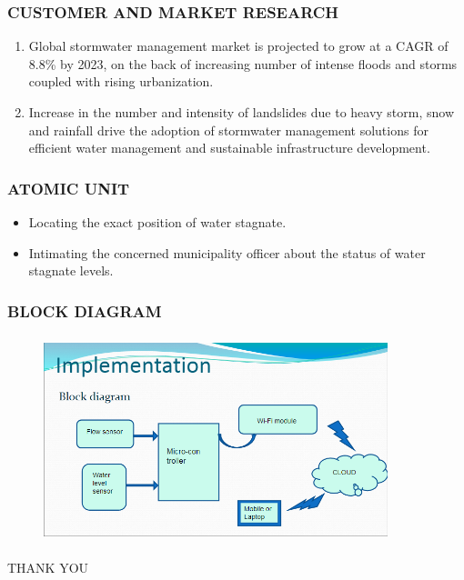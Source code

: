 \documentclass{beamer}
\begin{document}
\begin{frame}
\frametitle{CUSTOMER AND MARKET RESEARCH}
\begin{enumerate}
\item Global stormwater management market is projected to grow at a CAGR of 8.8\%  by 2023, on the back of increasing number of intense floods and storms coupled with rising urbanization.
\item Increase in the number and intensity of landslides due to heavy storm, snow and rainfall drive the adoption of stormwater management solutions for efficient water management and sustainable infrastructure development.
\end{enumerate}
\end{frame}
\begin{frame}
\frametitle{ATOMIC UNIT}
\begin{itemize}
\item Locating the exact position of water stagnate.
\item Intimating the concerned municipality officer about the status of  
 water stagnate levels.
\end{itemize}
\end{frame}
\begin{frame}
\frametitle{BLOCK DIAGRAM}
\begin{center}
\begin{figure}
\includegraphics[width=10cm,height=6cm]{456}
\end{figure}
\end{center}
\end{frame}
\begin{frame}
\begin{center}
THANK YOU
\end{center}
\end{frame}
\end{document}
